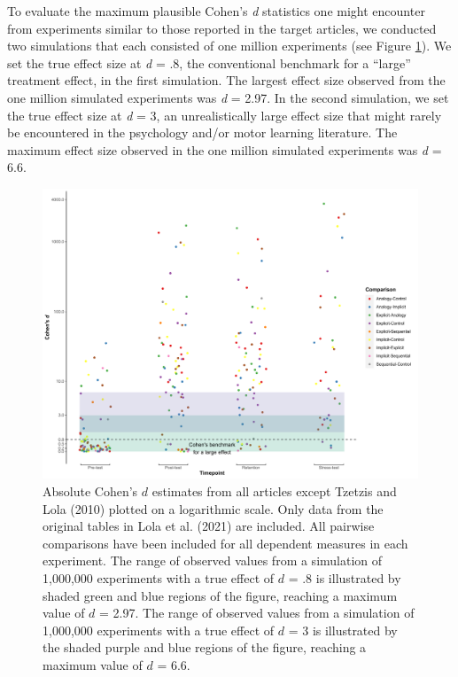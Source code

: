 \documentclass[
  english,
  man, donotrepeattitle,floatsintext]{apa7}
\begin{document}
To evaluate the maximum plausible Cohen's \emph{d} statistics one might encounter from experiments similar to those reported in the target articles, we conducted two simulations that each consisted of one million experiments (see Figure \ref{fig:fig1}). We set the true effect size at \emph{d} = .8, the conventional benchmark for a ``large'' treatment effect, in the first simulation. The largest effect size observed from the one million simulated experiments was \emph{d} = 2.97. In the second simulation, we set the true effect size at \emph{d} = 3, an unrealistically large effect size that might rarely be encountered in the psychology and/or motor learning literature. The maximum effect size observed in the one million simulated experiments was \emph{d} = 6.6.



\begin{figure}

{\centering \includegraphics[width=1\linewidth,height=1\textheight]{../../figs/fig1b} 

}

\caption{Absolute Cohen's \(d\) estimates from all articles except Tzetzis and Lola (2010) plotted on a logarithmic scale. Only data from the original tables in Lola et al. (2021) are included. All pairwise comparisons have been included for all dependent measures in each experiment. The range of observed values from a simulation of 1,000,000 experiments with a true effect of \(d\) = .8 is illustrated by shaded green and blue regions of the figure, reaching a maximum value of \(d\) = 2.97. The range of observed values from a simulation of 1,000,000 experiments with a true effect of \(d\) = 3 is illustrated by the shaded purple and blue regions of the figure, reaching a maximum value of \(d\) = 6.6.}\label{fig:fig1}
\end{figure}
\end{document}
